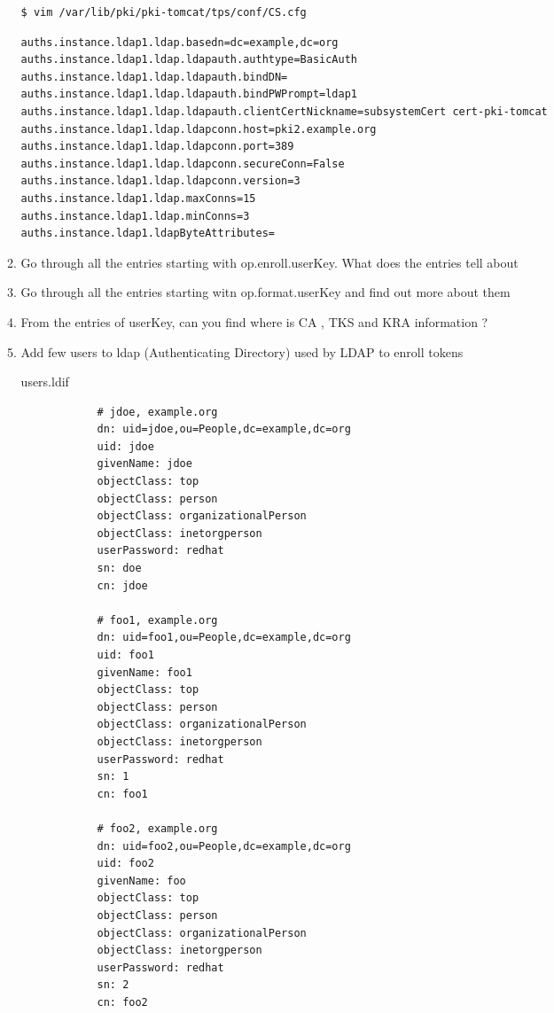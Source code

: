 \documentclass[a4paper]{article}
\begin{document}
\begin{enumerate}[label*=\arabic*.]
\begin{enumerate}[label*=\arabic*.]
\begin{lstlisting}[style=bashInputStyle]
$ vim /var/lib/pki/pki-tomcat/tps/conf/CS.cfg
                    \end{lstlisting}
                    \begin{lstlisting}
auths.instance.ldap1.ldap.basedn=dc=example,dc=org
auths.instance.ldap1.ldap.ldapauth.authtype=BasicAuth
auths.instance.ldap1.ldap.ldapauth.bindDN=
auths.instance.ldap1.ldap.ldapauth.bindPWPrompt=ldap1
auths.instance.ldap1.ldap.ldapauth.clientCertNickname=subsystemCert cert-pki-tomcat
auths.instance.ldap1.ldap.ldapconn.host=pki2.example.org
auths.instance.ldap1.ldap.ldapconn.port=389
auths.instance.ldap1.ldap.ldapconn.secureConn=False
auths.instance.ldap1.ldap.ldapconn.version=3
auths.instance.ldap1.ldap.maxConns=15
auths.instance.ldap1.ldap.minConns=3
auths.instance.ldap1.ldapByteAttributes=
                    \end{lstlisting}

            \item Go through all the entries starting with op.enroll.userKey. What does the entries tell about 
            \item Go through all the entries starting witn op.format.userKey and find out more about them
            \item From the entries of userKey, can you find where is CA , TKS and KRA information ?
            \item \label{token_ex1} Add few users to ldap (Authenticating Directory) used by LDAP to enroll tokens
                
            users.ldif
            \begin{lstlisting}
            # jdoe, example.org
            dn: uid=jdoe,ou=People,dc=example,dc=org
            uid: jdoe
            givenName: jdoe
            objectClass: top
            objectClass: person
            objectClass: organizationalPerson
            objectClass: inetorgperson
            userPassword: redhat
            sn: doe
            cn: jdoe

            # foo1, example.org
            dn: uid=foo1,ou=People,dc=example,dc=org
            uid: foo1
            givenName: foo1
            objectClass: top
            objectClass: person
            objectClass: organizationalPerson
            objectClass: inetorgperson
            userPassword: redhat
            sn: 1
            cn: foo1

            # foo2, example.org
            dn: uid=foo2,ou=People,dc=example,dc=org
            uid: foo2
            givenName: foo
            objectClass: top
            objectClass: person
            objectClass: organizationalPerson
            objectClass: inetorgperson
            userPassword: redhat
            sn: 2
            cn: foo2


\end{lstlisting}
\end{enumerate}
\end{enumerate}
\end{document}
